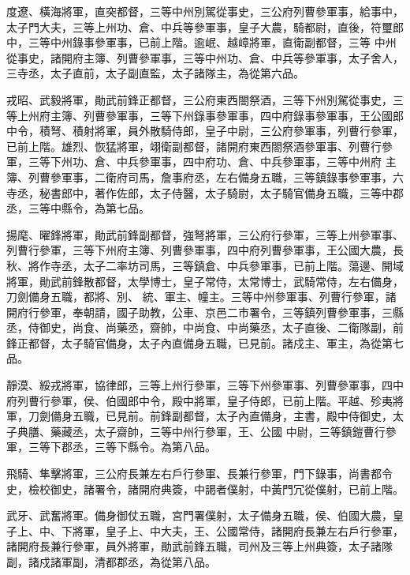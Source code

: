 \begin{pinyinscope}
 度遼、橫海將軍，直突都督，三等中州別駕從事史，三公府列曹參軍事，給事中，太子門大夫，三等上州功、倉、中兵等參軍事，皇子大農，騎都尉，直後，符璽郎中，三等中州錄事參軍事，已前上階。逾岷、越嶂將軍，直衛副都督，三等
 中州從事史，諸開府主簿、列曹參軍事，三等中州功、倉、中兵等參軍事，太子舍人，三寺丞，太子直前，太子副直監，太子諸隊主，為從第六品。



 戎昭、武毅將軍，勛武前鋒正都督，三公府東西閤祭酒，三等下州別駕從事史，三等上州府主簿、列曹參軍事，三等下州錄事參軍事，四中府錄事參軍事，王公國郎中令，積弩、積射將軍，員外散騎侍郎，皇子中尉，三公府參軍事，列曹行參軍，已前上階。雄烈、恢猛將軍，翊衛副都督，諸開府東西閤祭酒參軍事、列曹行參軍，三等下州功、倉、中兵參軍事，四中府功、倉、中兵參軍事，三等中州府
 主簿、列曹參軍事，二衛府司馬，詹事府丞，左右備身五職，三等鎮錄事參軍事，六寺丞，秘書郎中，著作佐郎，太子侍醫，太子騎尉，太子騎官備身五職，三等中郡丞，三等中縣令，為第七品。



 揚麾、曜鋒將軍，勛武前鋒副都督，強弩將軍，三公府行參軍，三等上州參軍事、列曹行參軍，三等下州府主簿、列曹參軍事，四中府列曹參軍事，王公國大農，長秋、將作寺丞，太子二率坊司馬，三等鎮倉、中兵參軍事，已前上階。蕩邊、開域將軍，勛武前鋒散都督，太學博士，皇子常侍，太常博士，武騎常侍，左右備身，刀劍備身五職，都將、別、
 統、軍主、幢主。三等中州參軍事、列曹行參軍，諸開府行參軍，奉朝請，國子助教，公車、京邑二市署令，三等鎮列曹參軍事，三縣丞，侍御史，尚食、尚藥丞，齋帥，中尚食、中尚藥丞，太子直後、二衛隊副，前鋒正都督，太子騎官備身，太子內直備身五職，已見前。諸戍主、軍主，為從第七品。



 靜漠、綏戎將軍，協律郎，三等上州行參軍，三等下州參軍事、列曹參軍事，四中府列曹行參軍，侯、伯國郎中令，殿中將軍，皇子侍郎，已前上階。平越、殄夷將軍，刀劍備身五職，已見前。前鋒副都督，太子內直備身，主書，殿中侍御史，太子典膳、藥藏丞，太子齋帥，三等中州行參軍，王、公國
 中尉，三等鎮鎧曹行參軍，三等下郡丞，三等下縣令。為第八品。



 飛騎、隼擊將軍，三公府長兼左右戶行參軍、長兼行參軍，門下錄事，尚書都令史，檢校御史，諸署令，諸開府典簽，中謁者僕射，中黃門冗從僕射，已前上階。



 武牙、武奮將軍。備身御仗五職，宮門署僕射，太子備身五職，侯、伯國大農，皇子上、中、下將軍，皇子上、中大夫，王、公國常侍，諸開府長兼左右戶行參軍，諸開府長兼行參軍，員外將軍，勛武前鋒五職，司州及三等上州典簽，太子諸隊副，諸戍諸軍副，清都郡丞，為從第八品。




\end{pinyinscope}
